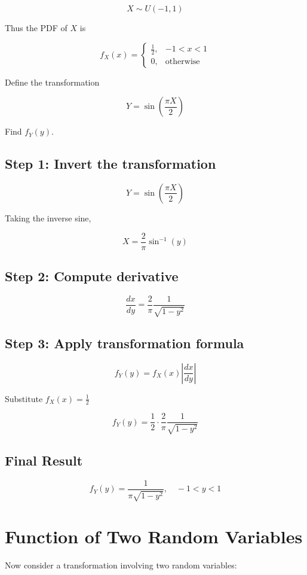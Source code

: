 \documentclass[11pt]{article}
\begin{document}
\[
X \sim U(-1,1)
\]

Thus the PDF of $X$ is

\[
f_X(x) =
\begin{cases}
\frac{1}{2}, & -1 < x < 1 \\
0, & \text{otherwise}
\end{cases}
\]

Define the transformation

\[
Y = \sin\left(\frac{\pi X}{2}\right)
\]

Find $f_Y(y)$.

\subsection{Step 1: Invert the transformation}

\[
Y = \sin\left(\frac{\pi X}{2}\right)
\]

Taking the inverse sine,

\[
X = \frac{2}{\pi}\sin^{-1}(y)
\]

\subsection{Step 2: Compute derivative}

\[
\frac{dx}{dy} =
\frac{2}{\pi}\frac{1}{\sqrt{1-y^2}}
\]

\subsection{Step 3: Apply transformation formula}

\[
f_Y(y) =
f_X(x)\left|\frac{dx}{dy}\right|
\]

Substitute $f_X(x) = \frac{1}{2}$

\[
f_Y(y) =
\frac{1}{2}
\cdot
\frac{2}{\pi}
\frac{1}{\sqrt{1-y^2}}
\]

\subsection{Final Result}

\[
f_Y(y) =
\frac{1}{\pi\sqrt{1-y^2}}, \quad -1 < y < 1
\]

\section{Function of Two Random Variables}

Now consider a transformation involving two random variables:
\end{document}

